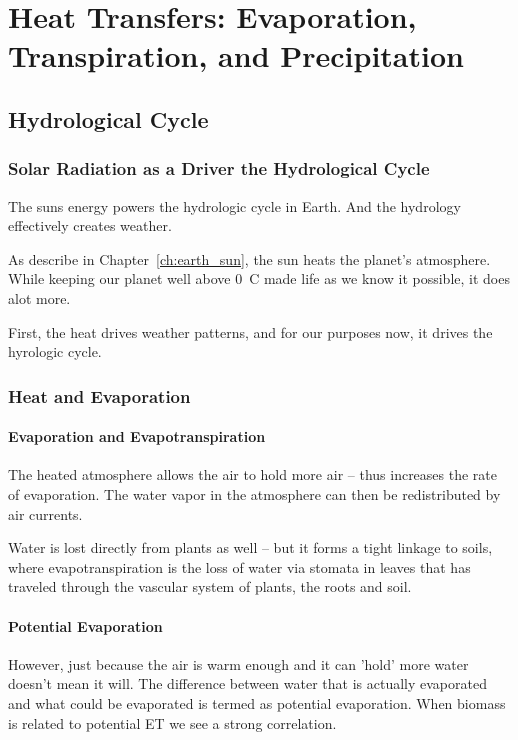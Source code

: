 \chapter{Heat Transfers: Evaporation, Transpiration, and Precipitation}\label{ch:evapotranspiration}

\section{Hydrological Cycle}

\subsection{Solar Radiation as a Driver the Hydrological Cycle}

The suns energy powers the hydrologic cycle in Earth. And the hydrology effectively creates weather. 

As describe in Chapter~\ref{ch:earth_sun}, the sun heats the planet's atmosphere. While keeping our planet well above 0~\degree C made life as we know it possible, it does alot more. 

First, the heat drives weather patterns, and for our purposes now, it drives the hyrologic cycle.  

\subsection{Heat and Evaporation}

\subsubsection{Evaporation and Evapotranspiration}

The heated atmosphere allows the air to hold more air -- thus increases the rate of evaporation. The water vapor in the atmosphere can then be redistributed by air currents.

Water is lost directly from plants as well -- but it forms a tight linkage to soils, where evapotranspiration is the loss of water via stomata in leaves that has traveled through the vascular system of plants, the roots and soil. 

\subsubsection{Potential Evaporation}

However, just because the air is warm enough and it can 'hold' more water doesn't mean it will. The difference between water that is actually evaporated and what could be evaporated is termed as potential evaporation. When biomass is related to potential ET we see a strong correlation. 


